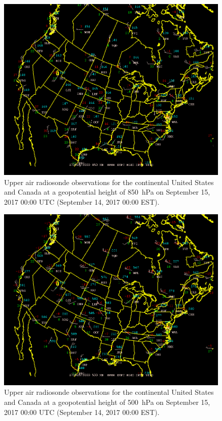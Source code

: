 \documentclass[11pt]{article}
\begin{document}
\begin{figure}
  \centering
  \includegraphics[width=\textwidth]{radiosondeUSA850hPa.png}
  \caption{Upper air radiosonde observations for the continental United States and Canada at a geopotential height of \SI{850}{\hecto\Pa} on September 15, 2017 00:00 UTC (September 14, 2017 00:00 EST).}
  \label{fig:radiosonde850hPa}
\end{figure}

\begin{figure}
  \centering
  \includegraphics[width=\textwidth]{radiosondeUSA500hPa.png}
  \caption{Upper air radiosonde observations for the continental United States and Canada at a geopotential height of \SI{500}{\hecto\Pa} on September 15, 2017 00:00 UTC (September 14, 2017 00:00 EST).}
  \label{fig:radiosonde500hPa}
\end{figure}
\end{document}
